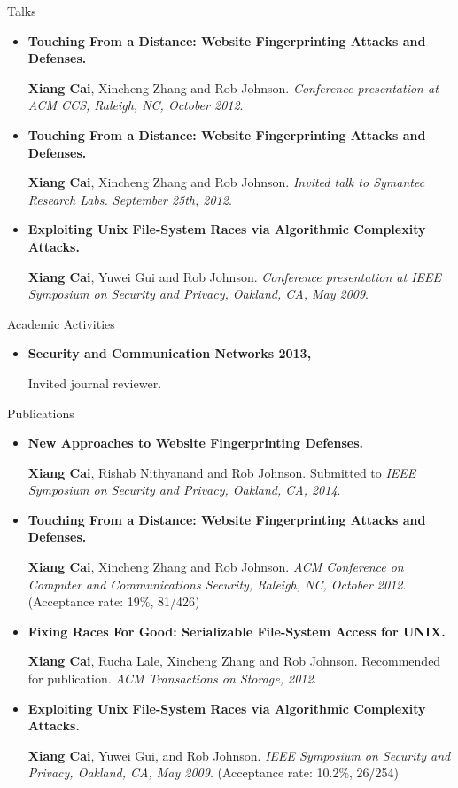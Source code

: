 \documentclass[11pt,oneside]{article}
\newenvironment{ressection}[1]{
	\vspace{4pt}
	{\fontfamily{phv}\selectfont\Large#1}
	\begin{itemize}
	\vspace{3pt}
}{
	\end{itemize}
}
\newcommand{\resitem}[1]{
	\vspace{-4pt}
	\item \begin{flushleft} #1 \end{flushleft}
}
\begin{document}
\begin{ressection}{Talks}
	\resitem{\textbf{Touching From a Distance: Website Fingerprinting
		Attacks and Defenses.} \begin{small} \textbf{Xiang Cai}, Xincheng Zhang
			and Rob Johnson. \textit {Conference presentation at ACM CCS, Raleigh, NC, October 2012}.
		\end{small}}
	\resitem{\textbf{Touching From a Distance: Website Fingerprinting
		Attacks and Defenses.} \begin{small} \textbf{Xiang Cai}, Xincheng Zhang
			and Rob Johnson. \textit{Invited talk to Symantec Research Labs. September 25th, 2012}.
		\end{small}}
	\resitem{\textbf{Exploiting Unix File-System Races via Algorithmic
		Complexity Attacks.} \begin{small} \textbf{Xiang Cai}, Yuwei Gui 
			and Rob Johnson. \textit{Conference presentation at IEEE Symposium on Security and Privacy, Oakland, CA, May 2009}.
		\end{small}}

\end{ressection}

\begin{ressection}{Academic Activities}
	\resitem{\textbf{Security and Communication Networks 2013, } \begin{small}Invited journal reviewer.\end{small}
	}
\end{ressection}

\begin{ressection}{Publications}
	\resitem{\textbf{New Approaches to Website Fingerprinting Defenses.} \begin{small} \textbf{Xiang Cai}, Rishab Nithyanand
			and Rob Johnson. Submitted to \textit{IEEE Symposium on Security and Privacy,
				Oakland, CA, 2014}.
	\end{small}}

	\resitem{\textbf{Touching From a Distance: Website Fingerprinting
		Attacks and Defenses.} \begin{small} \textbf{Xiang Cai}, Xincheng Zhang
			and Rob Johnson. \textit{ACM Conference on Computer and Communications Security, Raleigh, NC, October 2012}. (Acceptance rate: 19\%, 81/426)\end{small}}

	\resitem{\textbf{Fixing Races For Good: Serializable File-System
		Access for UNIX.} \begin{small} \textbf{Xiang Cai}, Rucha Lale,
		Xincheng Zhang and Rob Johnson. Recommended for publication. \textit{ACM Transactions on Storage, 2012}.\end{small}}

	\resitem{\textbf{Exploiting Unix File-System Races via Algorithmic
		Complexity Attacks.} \begin{small} \textbf{Xiang Cai}, Yuwei Gui, and
			Rob Johnson. \textit{IEEE Symposium on Security and Privacy,
				Oakland, CA, May 2009}. (Acceptance rate: 10.2\%, 26/254)\end{small}}

\end{ressection}
\end{document}
